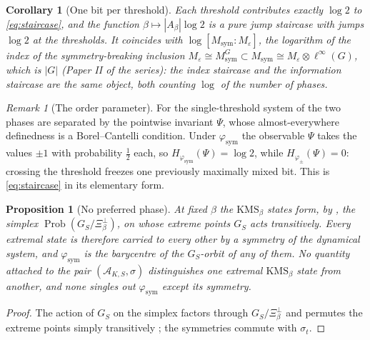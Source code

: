\documentclass[11pt]{amsart}
\numberwithin{equation}{section}
\newtheorem{proposition}[theorem]{Proposition}
\newtheorem{corollary}[theorem]{Corollary}
\theoremstyle{definition}
\theoremstyle{remark}
\newtheorem{remark}[theorem]{Remark}
\newcommand{\cA}{\mathcal{A}}
\newcommand{\Msym}{M_{\mathrm{sym}}}
\newcommand{\phisym}{\varphi_{\mathrm{sym}}}
\newcommand{\Prob}{\operatorname{Prob}}
\begin{document}
\begin{corollary}[One bit per threshold]\label{cor:bit}
Each threshold contributes exactly $\log2$ to \eqref{eq:staircase}, and the function
$\beta\mapsto|A_\beta|\log2$ is a pure jump staircase with jumps $\log2$ at the thresholds.
It coincides with $\log[\Msym:M_\varepsilon]$, the logarithm of the index of the
symmetry-breaking inclusion $M_\varepsilon\cong\Msym^G\subset\Msym\cong M_\varepsilon\otimes\ell^\infty(G)$,
which is $|G|$ (Paper II of the series): the index staircase and the information
staircase are the same object, both counting $\log$ of the number of phases.
\end{corollary}

\begin{remark}[The order parameter]\label{rem:psi}
For the single-threshold system of \cite[Prop.~4.12]{Main} the two phases are separated by
the pointwise invariant $\Psi$, whose almost-everywhere definedness is a Borel--Cantelli
condition. Under $\phisym$ the observable $\Psi$ takes the values $\pm1$ with probability
$\tfrac12$ each, so $H_{\phisym}(\Psi)=\log2$, while $H_{\varphi_\pm}(\Psi)=0$: crossing the
threshold freezes one previously maximally mixed bit. This is \eqref{eq:staircase} in its
elementary form.
\end{remark}

\begin{proposition}[No preferred phase]\label{prop:landauer}
At fixed $\beta$ the $\mathrm{KMS}_\beta$ states form, by \cite[Thm.~3.6]{Main}, the
simplex $\Prob(G_S/\Xi_\beta^\perp)$, on whose extreme points $G_S$ acts transitively. Every
extremal state is therefore carried to every other by a symmetry of the dynamical system,
and $\phisym$ is the barycentre of the $G_S$-orbit of any of them. No quantity attached to
the pair $(\cA_{K,S},\sigma)$ distinguishes one extremal $\mathrm{KMS}_\beta$ state from
another, and none singles out $\phisym$ except its symmetry.
\end{proposition}

\begin{proof}
The action of $G_S$ on the simplex factors through $G_S/\Xi_\beta^\perp$ and permutes the
extreme points simply transitively \cite[Thm.~3.6(3)]{Main}; the symmetries commute with
$\sigma_t$.
\end{proof}
\end{document}
